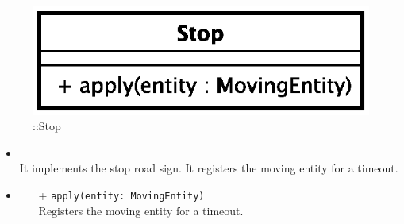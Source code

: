 \begin{figure}[h]
\centering
\includegraphics[scale=0.6,keepaspectratio]{images/solution/app/backend/stop.eps}
\caption{\pPassive::Stop}
\label{fig:sd-app-stop}
\end{figure}
\FloatBarrier
\begin{itemize}
  \item \textbf{\descr} \\
It implements the stop road sign. It registers the moving entity for a timeout.
  \item \textbf{\ops}
  \begin{itemize} 
  \item[+] \texttt{apply(entity: MovingEntity)} \\
Registers the moving entity for a timeout.
  \end{itemize}
\end{itemize}
